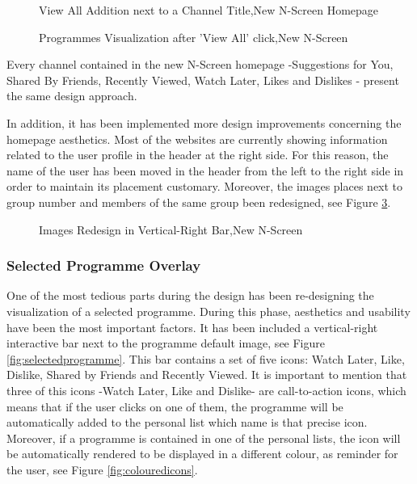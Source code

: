 \documentclass{acm_proc_article-sp}
\begin{document}
\begin{figure}[!htb]
\centering
{}
\caption{View All Addition next to a Channel Title,New N-Screen Homepage}
\label{fig:viewallzoom}
\end{figure}

\begin{figure}[!htb]
\centering
{}
\caption{Programmes Visualization after 'View All' click,New N-Screen}
\label{fig:viewallafter}
\end{figure}

Every channel contained in the new N-Screen homepage -Suggestions for You, Shared By Friends, Recently Viewed, Watch Later, Likes and Dislikes - present the same design approach. 

In addition, it has been implemented more design improvements concerning the homepage aesthetics. Most of the websites are currently showing information related to the user profile in the header at the right side\cite{colborne2010simple}\cite{krug2014don}\cite{norman2002design}. For this reason, the name of the user has been moved in the header from the left to the right side in order to maintain its placement customary. Moreover, the images places next to group number and members of the same group been redesigned, see Figure \ref{fig:roster}. 

\begin{figure}[!htb]
\centering
{}
\caption{Images Redesign in Vertical-Right Bar,New N-Screen}
\label{fig:roster}
\end{figure}

\subsubsection{Selected Programme Overlay}

One of the most tedious parts during the design has been re-designing the visualization of a selected programme. During this phase, aesthetics and usability have been the most important factors. It has been included a vertical-right interactive bar next to the programme default image, see Figure \ref{fig:selectedprogramme}. This bar contains a set of five icons: Watch Later, Like, Dislike, Shared by Friends and Recently Viewed. It is important to mention that three of this icons -Watch Later, Like and Dislike- are call-to-action icons, which means that if the user clicks on one of them, the programme will be automatically added to the personal list which name is that precise icon. Moreover, if a programme is contained in one of the personal lists, the icon will be automatically rendered to be displayed in a different colour, as reminder for the user, see Figure \ref{fig:colouredicons}. 
\end{document}
